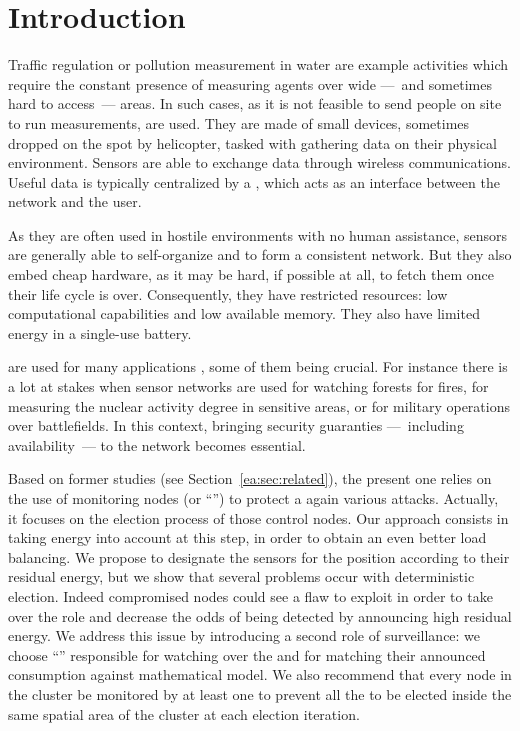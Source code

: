 \section{Introduction}

Traffic regulation or pollution measurement in water are example activities which require the constant presence of measuring agents over wide ---~and sometimes hard to access~--- areas.
In such cases, as it is not feasible to send people on site to run measurements, \wsns are used.
They are made of small devices, sometimes dropped on the spot by helicopter, tasked with gathering data on their physical environment.
Sensors are able to exchange data through wireless communications.
Useful data is typically centralized by a \bs, which acts as an interface between the network and the user.

As they are often used in hostile environments with no human assistance, sensors are generally able to self-organize and to form a consistent network.
But they also embed cheap hardware, as it may be hard, if possible at all, to fetch them once their life cycle is over.
Consequently, they have restricted resources: low computational capabilities and low available memory.
They also have limited energy%
in a single-use battery.

\Wsns are used for many applications%
, some of them being crucial.
For instance there is a lot at stakes when sensor networks are used for watching forests for fires, for measuring the nuclear activity degree in sensitive areas, or for military operations over battlefields.
In this context, bringing security guaranties ---~including availability~--- to the network becomes essential.

Based on former studies (see Section~\ref{ea:sec:related}), the present one relies on the use of monitoring nodes (or ``\cns'') to protect a \wsn again various \dos attacks.
Actually, it focuses on the election process of those control nodes.
Our approach consists in taking energy into account at this step, in order to obtain an even better load balancing.
We propose to designate the sensors for the \cn position according to their residual energy, but we show that several problems occur with deterministic election.
Indeed compromised nodes could see a flaw to exploit in order to take over the \cn role and decrease the odds of being detected by announcing high residual energy.
We address this issue by introducing a second role of surveillance: we choose ``\vns'' responsible for watching over the \cns and for matching their announced consumption against mathematical model.
We also recommend that every node in the cluster be monitored by at least one \cn to prevent all the \cns to be elected inside the same spatial area of the cluster at each election iteration.

